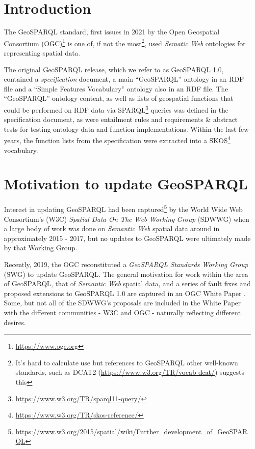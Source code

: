 \documentclass[runningheads]{llncs}
\begin{document}
\section{Introduction}\label{sec:introduction}
The GeoSPARQL standard, first issues in 2021 by the Open Geospatial Consortium (OGC)\footnote{\url{https://www.ogc.org}} 
is one of, if not the most\footnote{It's hard to calculate use but references to GeoSPARQL other well-known standards, 
such as DCAT2 (\url{https://www.w3.org/TR/vocab-dcat/}) suggests this}, used \textit{Sematic Web} ontologies for 
representing spatial data.

The original GeoSPARQL release, which we refer to as GeoSPARQL 1.0, contained a \textit{specification} document,
a main ``GeoSPARQL'' ontology in an RDF file and a ``Simple Features Vocabulary'' ontology also in an RDF file. The 
``GeoSPARQL'' ontology content, as well as lists of geospatial functions that could be performed on RDF data via 
SPARQL\footnote{\url{https://www.w3.org/TR/sparql11-query/}} queries was defined in the specification document, as
were entailment rules and requirements \& abstract tests for testing ontology data and function implementations. 
Within the last few years, the function lists from the specification were extracted into a SKOS\footnote{\url{https://www.w3.org/TR/skos-reference/}}
vocabulary.


\section{Motivation to update GeoSPARQL}\label{sec:motivation}
Interest in updating GeoSPARQL had been captured\footnote{\url{https://www.w3.org/2015/spatial/wiki/Further_development_of_GeoSPARQL}}
 by the World Wide Web Consortium's (W3C) \textit{Spatial Data On The Web Working Group} (SDWWG)
when a large body of work was done on \textit{Semantic Web} spatial data around in approximately 2015 - 2017, but 
no updates to GeoSPARQL were ultimately made by that Working Group.


Recently, 2019, the OGC reconstituted a \textit{GeoSPARQL Standards Working Group} (SWG) to update GeoSPARQL. The general 
motivation for work within the area of GeoSPARQL, that of \textit{Semantic Web} spatial data, and a series of
fault fixes and proposed extensions to GeoSPARQL 1.0 are captured in an OGC White Paper \cite{geosparqlwhitepaper}. Some,
but not all of the SDWWG's proposals are included in the White Paper with the different communities - W3C and OGC - 
naturally reflecting different desires.
\end{document}
